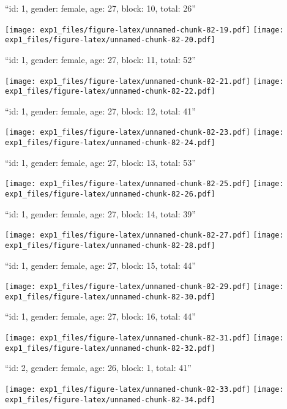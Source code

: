 \documentclass[11pt,,]{article}
\begin{document}
``id: 1, gender: female, age: 27, block: 10, total: 26''

\texttt{[image: exp1\_files/figure-latex/unnamed-chunk-82-19.pdf]}
\texttt{[image: exp1\_files/figure-latex/unnamed-chunk-82-20.pdf]}

\newpage
[1] 

``id: 1, gender: female, age: 27, block: 11, total: 52''

\texttt{[image: exp1\_files/figure-latex/unnamed-chunk-82-21.pdf]}
\texttt{[image: exp1\_files/figure-latex/unnamed-chunk-82-22.pdf]}

\newpage
[1] 

``id: 1, gender: female, age: 27, block: 12, total: 41''

\texttt{[image: exp1\_files/figure-latex/unnamed-chunk-82-23.pdf]}
\texttt{[image: exp1\_files/figure-latex/unnamed-chunk-82-24.pdf]}

\newpage
[1] 

``id: 1, gender: female, age: 27, block: 13, total: 53''

\texttt{[image: exp1\_files/figure-latex/unnamed-chunk-82-25.pdf]}
\texttt{[image: exp1\_files/figure-latex/unnamed-chunk-82-26.pdf]}

\newpage
[1] 

``id: 1, gender: female, age: 27, block: 14, total: 39''

\texttt{[image: exp1\_files/figure-latex/unnamed-chunk-82-27.pdf]}
\texttt{[image: exp1\_files/figure-latex/unnamed-chunk-82-28.pdf]}

\newpage
[1] 

``id: 1, gender: female, age: 27, block: 15, total: 44''

\texttt{[image: exp1\_files/figure-latex/unnamed-chunk-82-29.pdf]}
\texttt{[image: exp1\_files/figure-latex/unnamed-chunk-82-30.pdf]}

\newpage
[1] 

``id: 1, gender: female, age: 27, block: 16, total: 44''

\texttt{[image: exp1\_files/figure-latex/unnamed-chunk-82-31.pdf]}
\texttt{[image: exp1\_files/figure-latex/unnamed-chunk-82-32.pdf]}

\newpage
[1] 

``id: 2, gender: female, age: 26, block: 1, total: 41''

\texttt{[image: exp1\_files/figure-latex/unnamed-chunk-82-33.pdf]}
\texttt{[image: exp1\_files/figure-latex/unnamed-chunk-82-34.pdf]}

\newpage
[1] 
\end{document}
